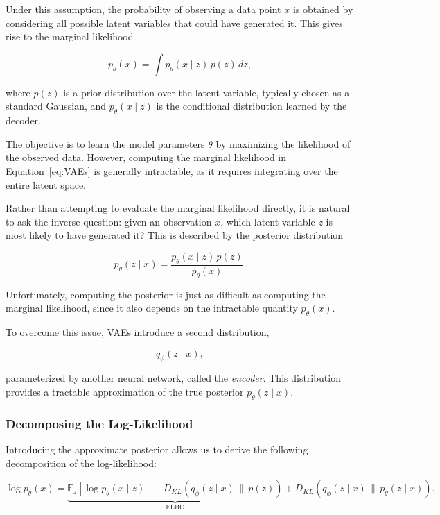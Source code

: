 Under this assumption, the probability of observing a data point $x$ is obtained by considering all possible latent variables that could have generated it. This gives rise to the marginal likelihood

\begin{equation}
    \label{eq:VAEs}
    p_\theta(x)
    =
    \int p_\theta(x \mid z)\,p(z)\,dz,
\end{equation}

where $p(z)$ is a prior distribution over the latent variable, typically chosen as a standard Gaussian, and $p_\theta(x \mid z)$ is the conditional distribution learned by the decoder.

The objective is to learn the model parameters $\theta$ by maximizing the likelihood of the observed data. However, computing the marginal likelihood in Equation~\ref{eq:VAEs} is generally intractable, as it requires integrating over the entire latent space.

Rather than attempting to evaluate the marginal likelihood directly, it is natural to ask the inverse question: given an observation $x$, which latent variable $z$ is most likely to have generated it? This is described by the posterior distribution

\begin{equation}
    p_\theta(z \mid x)
    =
    \frac{p_\theta(x \mid z)\,p(z)}
         {p_\theta(x)}.
\end{equation}

Unfortunately, computing the posterior is just as difficult as computing the marginal likelihood, since it also depends on the intractable quantity $p_\theta(x)$.

To overcome this issue, VAEs introduce a second distribution,

\[
q_\phi(z \mid x),
\]

parameterized by another neural network, called the \emph{encoder}. This distribution provides a tractable approximation of the true posterior $p_\theta(z \mid x)$.

\subsubsection{Decomposing the Log-Likelihood}

Introducing the approximate posterior allows us to derive the following decomposition of the log-likelihood:

\begin{equation}
    \log p_\theta(x)
    =
    \underbrace{
    \mathbb{E}_{z}
    \left[
        \log p_\theta(x \mid z)
    \right]
    -
    D_{KL}
    \left(
        q_\phi(z \mid x)
        \,\|\,
        p(z)
    \right)
    }_{\text{ELBO}}
    +
    D_{KL}
    \left(
        q_\phi(z \mid x)
        \,\|\,
        p_\theta(z \mid x)
    \right).
\end{equation}

